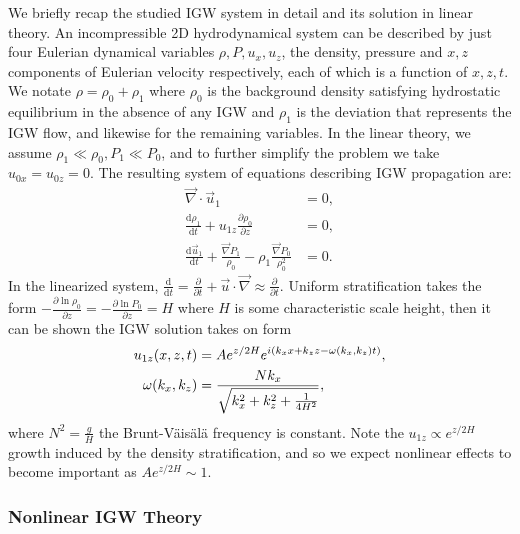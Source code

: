 \documentclass[11pt,
        usenames, %
        dvipsnames %
    ]{article}
\newcommand*{\rd}[2]{\frac{\mathrm{d}#1}{\mathrm{d}#2}}
\newcommand*{\pd}[2]{\frac{\partial#1}{\partial#2}}
\DeclarePairedDelimiter\p{\lparen}{\rparen}
\begin{document}
We briefly recap the studied IGW system in detail and its solution in linear
theory. An incompressible 2D hydrodynamical system can be described by just four
Eulerian dynamical variables $\rho, P, u_x, u_z$, the density, pressure and $x,
z$ components of Eulerian velocity respectively, each of which is a function of
$x, z, t$. We notate $\rho = \rho_0 + \rho_1$ where $\rho_0$ is the background
density satisfying hydrostatic equilibrium in the absence of any IGW and
$\rho_1$ is the deviation that represents the IGW flow, and likewise for the
remaining variables. In the linear theory, we assume $\rho_1 \ll \rho_0, P_1 \ll
P_0$, and to further simplify the problem we take $u_{0x} = u_{0z} = 0$. The
resulting system of equations describing IGW propagation are:
\begin{subequations}\label{se:igw_lin}
    \begin{align}
        \vec{\nabla} \cdot \vec{u}_1 &= 0,\\
        \rd{\rho_1}{t} + u_{1z}\pd{\rho_0}{z} &= 0,\\
        \rd{\vec{u}_1}{t} + \frac{\vec{\nabla}P_1}{\rho_0}
            - \rho_1 \frac{\vec{\nabla}P_0}{\rho_0^2} &= 0.
    \end{align}
\end{subequations}
In the linearized system, $\rd{}{t} = \pd{}{t} + \vec{u} \cdot \vec{\nabla}
\approx \pd{}{t}$. Uniform stratification takes the form $-\pd{\ln \rho_0}{z} =
-\pd{\ln P_0}{z} = H$ where $H$ is some characteristic scale height, then it can
be shown the IGW solution takes on form
\begin{align}
    u_{1z}(x, z, t) &= Ae^{z/2H}e^{i\p*{k_xx + k_zz - \omega(k_x, k_z) t}},
        \label{eq:plane}\\
    \omega(k_x, k_z) &= \frac{Nk_x}{\sqrt{k_x^2 + k_z^2 + \frac{1}{4H^2}}},
\end{align}
where $N^2 = \frac{g}{H}$ the Brunt-V\"ais\"al\"a frequency is constant. Note
the $u_{1z} \propto e^{z/2H}$ growth induced by the density stratification, and
so we expect nonlinear effects to become important as $Ae^{z/2H} \sim 1$.

\subsubsection{Nonlinear IGW Theory}
\end{document}
